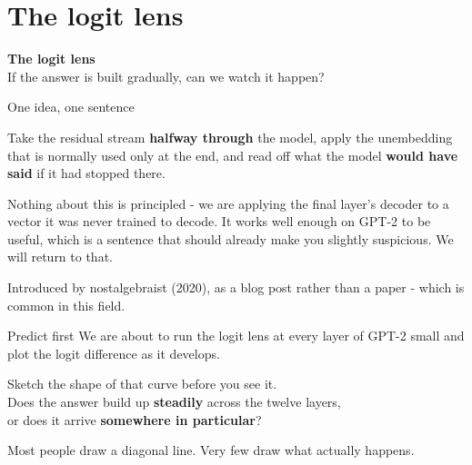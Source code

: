 \documentclass[aspectratio=169]{beamer}
\newcommand{\keybox}[1]{%
  \begin{tcolorbox}[colback=armblue!8, colframe=armblue, boxrule=0.6pt, arc=2pt]
  #1
  \end{tcolorbox}}
\newcommand{\sectiontransition}[2]{%
  \begin{frame}[plain]
    \vfill
    \begin{center}
      {\Huge\bfseries\color{popblue} #1}\\[1.1em]
      {\large #2}
    \end{center}
    \vfill
  \end{frame}}
\begin{document}
\section{The logit lens}
\sectiontransition{The logit lens}{If the answer is built gradually, can we watch it happen?}

\begin{frame}{One idea, one sentence}
  \vspace{0.9em}
  \keybox{Take the residual stream \textbf{halfway through} the model, apply the unembedding
  that is normally used only at the end, and read off what the model \textbf{would have said}
  if it had stopped there.}

  \vspace{0.9em}
  Nothing about this is principled - we are applying the final layer's decoder to a vector it
  was never trained to decode. It works well enough on GPT-2 to be useful, which is a sentence
  that should already make you slightly suspicious. We will return to that.

  \vspace{0.7em}
  {\footnotesize Introduced by nostalgebraist (2020), as a blog post rather than a paper - which
  is common in this field.}
\end{frame}

\begin{frame}{Predict first}
  \vspace{1.0em}
  We are about to run the logit lens at every layer of GPT-2 small and plot the logit difference
  as it develops.

  \vspace{1.4em}
  \begin{center}
    {\large Sketch the shape of that curve before you see it.}\\[0.7em]
    {\normalsize Does the answer build up \textbf{steadily} across the twelve layers,\\
     or does it arrive \textbf{somewhere in particular}?}
  \end{center}

  \vspace{1.4em}
  \begin{center}
    {\footnotesize Most people draw a diagonal line. Very few draw what actually happens.}
  \end{center}
\end{frame}
\end{document}
